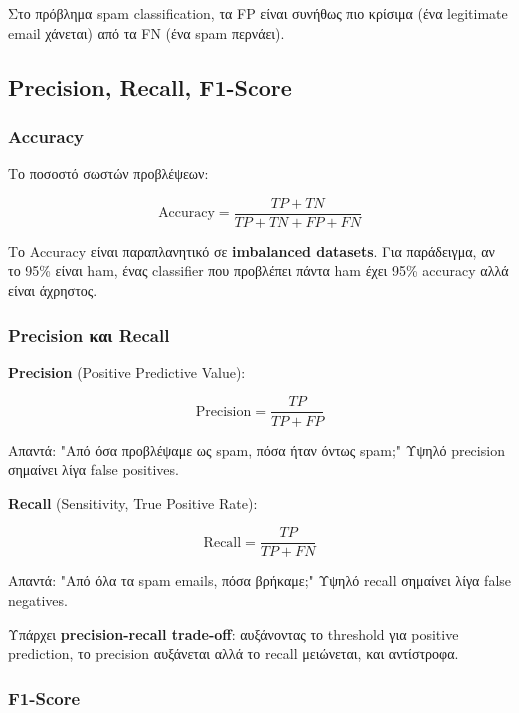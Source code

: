 \documentclass[12pt,a4paper,twoside]{book}
\begin{document}
Στο πρόβλημα spam classification, τα FP είναι συνήθως πιο κρίσιμα (ένα legitimate email χάνεται) από τα FN (ένα spam περνάει).

\subsection{Precision, Recall, F1-Score}

\subsubsection*{Accuracy}

Το ποσοστό σωστών προβλέψεων:

\begin{equation}
    \text{Accuracy} = \frac{TP + TN}{TP + TN + FP + FN}
\end{equation}

Το Accuracy είναι παραπλανητικό σε \textbf{imbalanced datasets}. Για παράδειγμα, αν το 95\% είναι ham, ένας classifier που προβλέπει πάντα ham έχει 95\% accuracy αλλά είναι άχρηστος.

\subsubsection*{Precision και Recall}

\textbf{Precision} (Positive Predictive Value):

\begin{equation}
    \text{Precision} = \frac{TP}{TP + FP}
\end{equation}

Απαντά: "Από όσα προβλέψαμε ως spam, πόσα ήταν όντως spam;" Υψηλό precision σημαίνει λίγα false positives.

\textbf{Recall} (Sensitivity, True Positive Rate):

\begin{equation}
    \text{Recall} = \frac{TP}{TP + FN}
\end{equation}

Απαντά: "Από όλα τα spam emails, πόσα βρήκαμε;" Υψηλό recall σημαίνει λίγα false negatives.

Υπάρχει \textbf{precision-recall trade-off}: αυξάνοντας το threshold για positive prediction, το precision αυξάνεται αλλά το recall μειώνεται, και αντίστροφα.

\subsubsection*{F1-Score}
\end{document}
